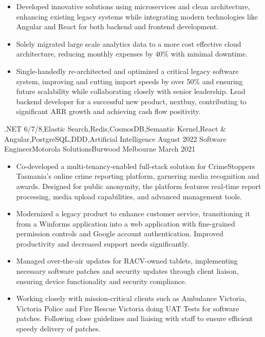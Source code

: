 \begin{experiences}
{\begin{itemize}
                        \item Developed innovative solutions using microservices and clean architecture, enhancing existing legacy systems while integrating modern technologies like Angular and React for both backend and frontend development.       
                        \item Solely migrated large scale analytics data to a more cost effective cloud architecture, reducing monthly expenses by 40\% with minimal downtime.
                        \item Single-handedly re-architected and optimized a critical legacy software system, improving and cutting import speeds by over 50\% and ensuring future scalability while collaborating closely with senior leadership. Lead backend developer for a successful new product, nextbuy, contributing to significant ARR growth and achieving cash flow positivity.                                                                   
                      \end{itemize}
                    }
                    {.NET 6/7/8,Elastic Search,Redis,CosmosDB,Semantic Kernel,React \& Angular,PostgreSQL,DDD,Artificial Intelligence}
  \emptySeparator
  \experience
    {August 2022} {Software Engineer}{Motorola Solutions}{Burwood Melbourne}
    {March 2021}    {
                      \begin{itemize}
                        \item Co-developed a multi-tenancy-enabled full-stack solution for CrimeStoppers Tasmania's online crime reporting platform, garnering media recognition and awards. Designed for public anonymity, the platform features real-time report processing, media upload capabilities, and advanced management tools.
                        \item Modernized a legacy product to enhance customer service, transitioning it from a Winforms application into a web application with fine-grained permission controls and Google account authentication. Improved productivity and decreased support needs significantly.
                        \item Managed over-the-air updates for RACV-owned tablets, implementing necessary software patches and security updates through client liaison, ensuring device functionality and security compliance.
                        \item Working closely with mission-critical clients such as Ambulance Victoria, Victoria Police and Fire Rescue Victoria doing UAT Tests for software patches. Following close guidelines and liaising with staff to ensure efficient speedy delivery of patches.

\end{itemize}}
\end{experiences}
